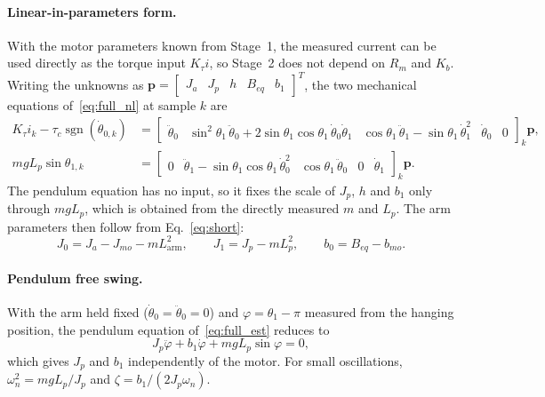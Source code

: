 \documentclass[a4paper,11pt]{article}
\newcommand{\La}{L_{\mathrm{arm}}}
\newcommand{\sgn}{\operatorname{sgn}}
\begin{document}
\paragraph{Linear-in-parameters form.} With the motor parameters known from Stage~1, the measured current can be used directly as the torque input $K_\tau i$, so Stage~2 does not depend on $R_m$ and $K_b$. Writing the unknowns as $\mathbf{p} = \begin{bmatrix} J_a & J_p & h & B_{eq} & b_1 \end{bmatrix}^T$, the two mechanical equations of~\eqref{eq:full_nl} at sample $k$ are
\begin{equation}
\begin{aligned}
  K_\tau i_k - \tau_c \sgn(\dot\theta_{0,k}) &= \begin{bmatrix} \ddot\theta_0 & \sin^2\theta_1\, \ddot\theta_0 + 2\sin\theta_1\cos\theta_1\, \dot\theta_0 \dot\theta_1 & \cos\theta_1\, \ddot\theta_1 - \sin\theta_1\, \dot\theta_1^2 & \dot\theta_0 & 0 \end{bmatrix}_k \mathbf{p} ,\\
  m g L_p \sin\theta_{1,k} &= \begin{bmatrix} 0 & \ddot\theta_1 - \sin\theta_1 \cos\theta_1\, \dot\theta_0^2 & \cos\theta_1\, \ddot\theta_0 & 0 & \dot\theta_1 \end{bmatrix}_k \mathbf{p} .
\end{aligned}
\label{eq:full_reg}
\end{equation}
The pendulum equation has no input, so it fixes the scale of $J_p$, $h$ and $b_1$ only through $m g L_p$, which is obtained from the directly measured $m$ and $L_p$. The arm parameters then follow from Eq.~\eqref{eq:short}:
\begin{equation}
  J_0 = J_a - J_{mo} - m \La^2, \qquad J_1 = J_p - m L_p^2, \qquad b_0 = B_{eq} - b_{mo} .
\end{equation}

\paragraph{Pendulum free swing.} With the arm held fixed ($\dot\theta_0 = \ddot\theta_0 = 0$) and $\varphi = \theta_1 - \pi$ measured from the hanging position, the pendulum equation of~\eqref{eq:full_est} reduces to
\begin{equation}
  J_p \ddot\varphi + b_1 \dot\varphi + m g L_p \sin\varphi = 0 ,
  \label{eq:swing}
\end{equation}
which gives $J_p$ and $b_1$ independently of the motor. For small oscillations, $\omega_n^2 = m g L_p / J_p$ and $\zeta = b_1 / (2 J_p \omega_n)$.
\end{document}
